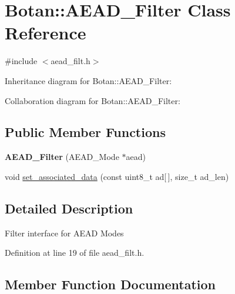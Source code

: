 \hypertarget{class_botan_1_1_a_e_a_d___filter}{}\section{Botan\+:\+:A\+E\+A\+D\+\_\+\+Filter Class Reference}
\label{class_botan_1_1_a_e_a_d___filter}


{\ttfamily \#include $<$aead\+\_\+filt.\+h$>$}



Inheritance diagram for Botan\+:\+:A\+E\+A\+D\+\_\+\+Filter\+:


Collaboration diagram for Botan\+:\+:A\+E\+A\+D\+\_\+\+Filter\+:
\subsection*{Public Member Functions}
\begin{DoxyCompactItemize}
\item 
\mbox{\label{class_botan_1_1_a_e_a_d___filter_a7b985bb43560408aa651ba3c3d07d53d}} 
{\bfseries A\+E\+A\+D\+\_\+\+Filter} (A\+E\+A\+D\+\_\+\+Mode $\ast$aead)
\item 
void \mbox{\hyperlink{class_botan_1_1_a_e_a_d___filter_a6788dae43fe6f0380149b0439813d407}{set\+\_\+associated\+\_\+data}} (const uint8\+\_\+t ad\mbox{[}$\,$\mbox{]}, size\+\_\+t ad\+\_\+len)
\end{DoxyCompactItemize}


\subsection{Detailed Description}
Filter interface for A\+E\+AD Modes 

Definition at line 19 of file aead\+\_\+filt.\+h.



\subsection{Member Function Documentation}
\mbox{\label{class_botan_1_1_a_e_a_d___filter_a6788dae43fe6f0380149b0439813d407}} 
